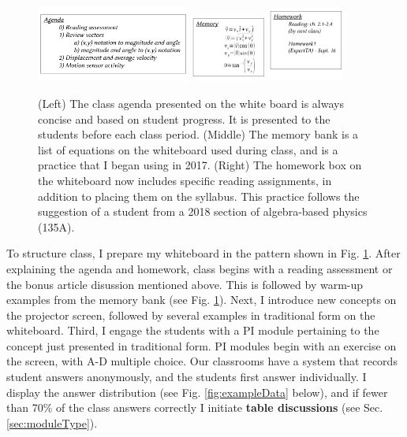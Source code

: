 \documentclass[../../../main.tex]{subfiles}
\begin{document}
\begin{figure}[ht]
\centering
\includegraphics[width=0.45\textwidth]{ExampleAgenda.pdf}
\includegraphics[width=0.22\textwidth]{ExampleMemory.pdf}
\includegraphics[width=0.22\textwidth]{ExampleHomework.pdf}
\caption{\label{fig:courses:intro:exampleAgenda} (Left) The class agenda presented on the white board is always concise and based on student progress.  It is presented to the students before each class period.  (Middle) The memory bank is a list of equations on the whiteboard used during class, and is a practice that I began using in 2017.  (Right) The homework box on the whiteboard now includes specific reading assignments, in addition to placing them on the syllabus.  This practice follows the suggestion of a student from a 2018 section of algebra-based physics (135A).}
\end{figure}

To structure class, I prepare my whiteboard in the pattern shown in Fig. \ref{fig:courses:intro:exampleAgenda}.  After explaining the agenda and homework, class begins with a reading assessment or the bonus article disussion mentioned above.  This is followed by warm-up examples from the memory bank (see Fig. \ref{fig:courses:intro:exampleAgenda}).  Next, I introduce new concepts on the projector screen, followed by several examples in traditional form on the whiteboard.  Third, I engage the students with a PI module pertaining to the concept just presented in traditional form.  PI modules begin with an exercise on the screen, with A-D multiple choice.  Our classrooms have a system that records student answers anonymously, and the students first answer individually.  I display the answer distribution (see Fig. \ref{fig:exampleData} below), and if fewer than 70\% of the class answers correctly I initiate \textbf{table discussions} (see Sec. \ref{sec:moduleType}).  \\ \hspace{0.1cm}
\end{document}
